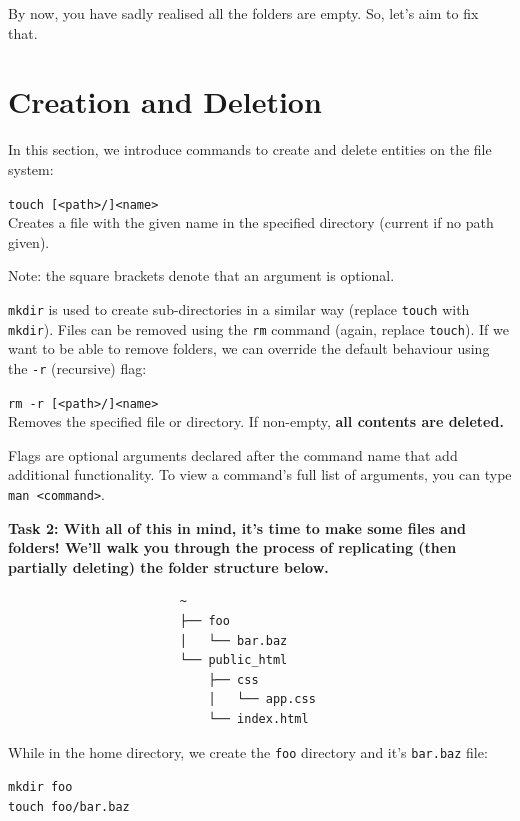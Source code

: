 \documentclass[a4paper,11pt,parskip=half-]{scrartcl}
\begin{document}
\newpage

By now, you have sadly realised all the folders are empty. 
So, let's aim to fix that.

\section*{Creation and Deletion}

In this section, we introduce commands to create and delete entities on the file system:

\Large \texttt{touch [<path>/]<name>} \normalsize \\
Creates a file with the given name in the specified directory (current if no path given).

Note: the square brackets denote that an argument is optional.

\texttt{mkdir} is used to create sub-directories in a similar way (replace \texttt{touch} with \texttt{mkdir}).
Files can be removed using the \texttt{rm} command (again, replace \texttt{touch}). 
If we want to be able to remove folders, we can override the default behaviour using the \texttt{-r} (recursive) flag:

\Large \texttt{rm -r [<path>/]<name>} \normalsize \\
Removes the specified file or directory. 
If non-empty, \bfseries all contents are deleted. \normalfont 

Flags are optional arguments declared after the command name that add additional functionality. 
To view a command's full list of arguments, you can type \texttt{man <command>}.

\bfseries Task 2: \normalfont 
With all of this in mind, it’s time to make some files and folders! 
We'll walk you through the process of replicating (then partially deleting) the folder structure below.

\begin{verbatim}
                        ~
                        ├── foo
                        │   └── bar.baz
                        └── public_html
                            ├── css
                            │   └── app.css
                            └── index.html
\end{verbatim}

While in the home directory, we create the \texttt{foo} directory and it's \texttt{bar.baz} file:

\qquad \texttt{mkdir foo} \\
\qquad \texttt{touch foo/bar.baz}
\end{document}
